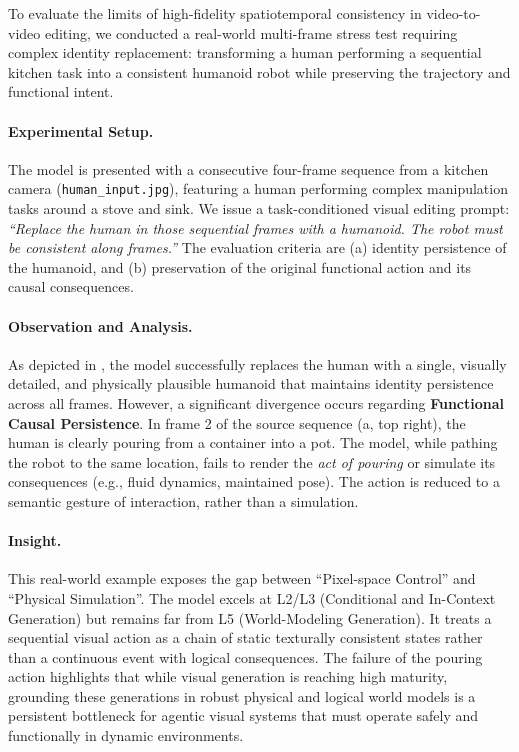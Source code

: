 To evaluate the limits of high-fidelity spatiotemporal consistency in video-to-video editing, we conducted a real-world multi-frame stress test requiring complex identity replacement: transforming a human performing a sequential kitchen task into a consistent humanoid robot while preserving the trajectory and functional intent.

\paragraph{Experimental Setup.}
The model is presented with a consecutive four-frame sequence from a kitchen camera (\texttt{human\_input.jpg}), featuring a human performing complex manipulation tasks around a stove and sink. We issue a task-conditioned visual editing prompt: \textit{``Replace the human in those sequential frames with a humanoid. The robot must be consistent along frames.''} The evaluation criteria are (a) identity persistence of the humanoid, and (b) preservation of the original functional action and its causal consequences.


\paragraph{Observation and Analysis.}
As depicted in , the model successfully replaces the human with a single, visually detailed, and physically plausible humanoid that maintains identity persistence across all frames. However, a significant divergence occurs regarding \textbf{Functional Causal Persistence}. In frame 2 of the source sequence (a, top right), the human is clearly pouring from a container into a pot. The model, while pathing the robot to the same location, fails to render the \textit{act of pouring} or simulate its consequences (e.g., fluid dynamics, maintained pose). The action is reduced to a semantic gesture of interaction, rather than a simulation.

\paragraph{Insight.}
This real-world example exposes the gap between ``Pixel-space Control'' and ``Physical Simulation''. The model excels at L2/L3 (Conditional and In-Context Generation) but remains far from L5 (World-Modeling Generation). It treats a sequential visual action as a chain of static texturally consistent states rather than a continuous event with logical consequences. The failure of the pouring action highlights that while visual generation is reaching high maturity, grounding these generations in robust physical and logical world models is a persistent bottleneck for agentic visual systems that must operate safely and functionally in dynamic environments.


